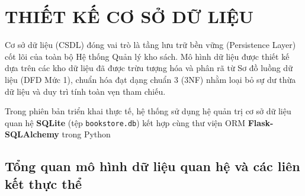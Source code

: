 \documentclass[12pt,a4paper]{article}
\begin{document}
\newpage
\section{THIẾT KẾ CƠ SỞ DỮ LIỆU}
\label{sec:thiet-ke-csdl}

Cơ sở dữ liệu (CSDL) đóng vai trò là tầng lưu trữ bền vững (Persistence Layer) cốt lõi của toàn bộ Hệ thống Quản lý kho sách. Mô hình dữ liệu được thiết kế dựa trên các kho dữ liệu đã được trừu tượng hóa và phân rã từ Sơ đồ luồng dữ liệu (DFD Mức 1), chuẩn hóa đạt dạng chuẩn 3 (3NF) nhằm loại bỏ sự dư thừa dữ liệu và duy trì tính toàn vẹn tham chiếu.

Trong phiên bản triển khai thực tế, hệ thống sử dụng hệ quản trị cơ sở dữ liệu quan hệ \textbf{SQLite} (tệp \texttt{bookstore.db}) kết hợp cùng thư viện ORM \textbf{Flask-SQLAlchemy} trong Python

\subsection{Tổng quan mô hình dữ liệu quan hệ và các liên kết thực thể}
\label{subsec:tong-quan-csdl}
\end{document}

